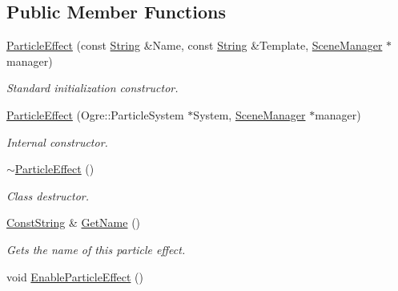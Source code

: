 \subsection*{Public Member Functions}
\begin{DoxyCompactItemize}
\item 
\hyperlink{classphys_1_1ParticleEffect_a42d17b7cd81968603c70920c30e6f812}{ParticleEffect} (const \hyperlink{namespacephys_aa03900411993de7fbfec4789bc1d392e}{String} \&Name, const \hyperlink{namespacephys_aa03900411993de7fbfec4789bc1d392e}{String} \&Template, \hyperlink{classphys_1_1SceneManager}{SceneManager} $\ast$manager)
\begin{DoxyCompactList}\small\item\em Standard initialization constructor. \item\end{DoxyCompactList}\item 
\hyperlink{classphys_1_1ParticleEffect_a112c7e4b2ec7c34c3aba3bd422ef8a1c}{ParticleEffect} (Ogre::ParticleSystem $\ast$System, \hyperlink{classphys_1_1SceneManager}{SceneManager} $\ast$manager)
\begin{DoxyCompactList}\small\item\em Internal constructor. \item\end{DoxyCompactList}\item 
\hypertarget{classphys_1_1ParticleEffect_a8c9c3d0cd1d02acdc626266ee485f51f}{
\hyperlink{classphys_1_1ParticleEffect_a8c9c3d0cd1d02acdc626266ee485f51f}{$\sim$ParticleEffect} ()}
\label{d2/d69/classphys_1_1ParticleEffect_a8c9c3d0cd1d02acdc626266ee485f51f}

\begin{DoxyCompactList}\small\item\em Class destructor. \item\end{DoxyCompactList}\item 
\hyperlink{namespacephys_a5ce5049f8b4bf88d6413c47b504ebb31}{ConstString} \& \hyperlink{classphys_1_1ParticleEffect_a4e953f59bd989c7e5e59d26adf9fd60a}{GetName} ()
\begin{DoxyCompactList}\small\item\em Gets the name of this particle effect. \item\end{DoxyCompactList}\item 
\hypertarget{classphys_1_1ParticleEffect_aee95ac9b688885361d3066a5a4b83965}{
void \hyperlink{classphys_1_1ParticleEffect_aee95ac9b688885361d3066a5a4b83965}{EnableParticleEffect} ()}
\label{d2/d69/classphys_1_1ParticleEffect_aee95ac9b688885361d3066a5a4b83965}


\end{DoxyCompactItemize}
